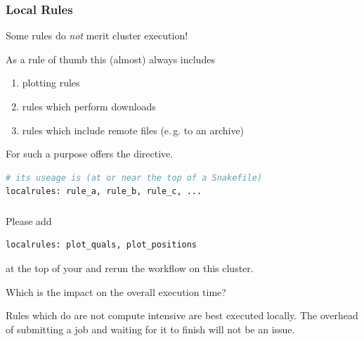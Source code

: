 \begin{frame}[fragile]
  \frametitle{Local Rules}
  \begin{hint}[]
  	Some rules do \emph{not} merit cluster execution!
  \end{hint}
  \pause
  As a rule of thumb this (almost) always includes
  \begin{enumerate}
   \item plotting rules
   \item rules which perform downloads
   \item rules which include remote files (e.\,g. to an archive)
  \end{enumerate}
  \pause
  For such a purpose \Snakemake{} offers the  directive.
  \begin{lstlisting}[language=Python,style=Python]
# its useage is (at or near the top of a Snakefile)
localrules: rule_a, rule_b, rule_c, ...
  \end{lstlisting}

\end{frame}

\begin{frame}[fragile]
  \frametitle{}
  Please add
  \begin{lstlisting}[language=Python,style=Python]
localrules: plot_quals, plot_positions
  \end{lstlisting}
  at the top of your  and rerun the workflow on this cluster.
  \pause
  \begin{question}
  	Which is the impact on the overall execution time?
  \end{question}
  \pause
  \begin{hint}
  	Rules which do are not compute intensive are best executed locally. The overhead of submitting a job and waiting for it to finish will not be an issue.
  \end{hint}
\end{frame}

